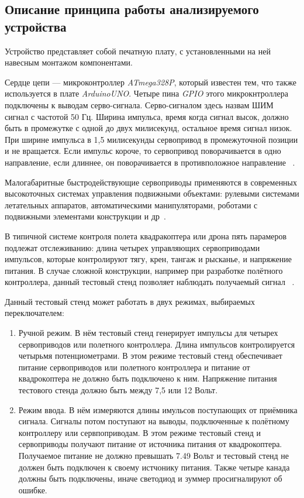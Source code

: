 \subsection{Описание принципа работы анализируемого устройства}

Устройство представляет собой печатную плату, с установленными на ней навесным монтажом компонентами.


Сердце цепи — микроконтроллер \textit{ATmega328P},
который известен тем, что также используется в плате \textit{ArduinoUNO}.
Четыре пина \textit{GPIO} этого микрокнтроллера подключены к выводам серво-сигнала.
Серво-сигналом здесь назвам ШИМ сигнал с частотой 50 Гц.
Ширина импульса, время когда сигнал высок,
должно быть в промежутке с одной до двух милисекунд,
остальное время сигнал низок. При ширине импульса в 1,5 милисекунды сервопривод в промежуточной позиции и не вращается.
Если импульс короче, то сервопривод поворачивается в одно направление, если длиннее,
он поворачивается в противположное направление ~\cite{Elector521}.


Малогабаритные быстродействующие сервоприводы применяются в современных высокоточных системах управления подвижными объектами: рулевыми системами летательных аппаратов, автоматическими манипуляторами, роботами с подвижными элементами конструкции и др~\cite{dyakovSUBSTANTIATIONRELIABILITYSERVOMOTORS2023}.


В типичной системе контроля полета квадракоптера или дрона
пять парамеров подлежат отслеживанию:
длина четырех управляющих сервоприводами импульсов,
которые контролируют тягу, крен, тангаж и рысканье,
и напряжение питания.
В случае сложной конструкции,
например при разработке полётного контроллера,
данный тестовый стенд позволяет наблюдать получаемый сигнал ~\cite{Elector521}.



Данный тестовый стенд может работать в двух режимах,
выбираемых переключателем:
\begin{enumerate}[label={\arabic*.}]
\item Ручной режим. В нём тестовый стенд генерирует импульсы для четырех сервоприводов или полетного контроллера. Длина импульсов контролируется четырьмя потенциометрами. В этом режиме тестовый стенд обеспечивает питание сервоприводов или полетного контроллера и питание от квадрокоптера не должно быть подключено к ним. Напряжение питания тестового стенда должно быть между 7,5 или 12 Вольт.
\item Режим ввода. В нём измеряются длины имульсов поступающих от приёмника сигнала. Сигналы потом поступают на выводы, подключенные к полётному контроллеру или сервпоприводам.
  В этом режиме тестовый стенд и сервоприводы получают питание от источника питания от квадрокоптера. Получаемое питание не должно превышать 7.49 Вольт и тестовый стенд не должен быть подключен к своему истчонику питания. Также четыре канада должны быть подключены, иначе светодиод и зуммер просигналируют об ошибке.  
\end{enumerate}


